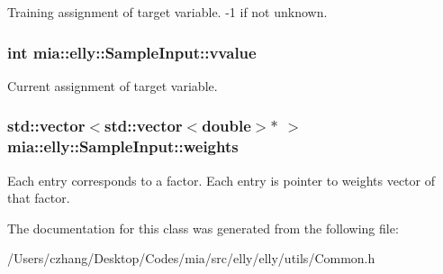 Training assignment of target variable. -\/1 if not unknown. \hypertarget{classmia_1_1elly_1_1_sample_input_a89286408bf1f1ff6fa60b0427f246653}{
\subsubsection[{vvalue}]{\setlength{\rightskip}{0pt plus 5cm}int mia\-::elly\-::\-Sample\-Input\-::vvalue}}\label{classmia_1_1elly_1_1_sample_input_a89286408bf1f1ff6fa60b0427f246653}
Current assignment of target variable. \hypertarget{classmia_1_1elly_1_1_sample_input_a34c24a75257fa27d5d728719afcdde43}{
\subsubsection[{weights}]{\setlength{\rightskip}{0pt plus 5cm}std\-::vector$<$std\-::vector$<$double$>$$\ast$ $>$ mia\-::elly\-::\-Sample\-Input\-::weights}}\label{classmia_1_1elly_1_1_sample_input_a34c24a75257fa27d5d728719afcdde43}
Each entry corresponds to a factor. Each entry is pointer to weights vector of that factor. 

The documentation for this class was generated from the following file\-:\begin{DoxyCompactItemize}
\item 
/\-Users/czhang/\-Desktop/\-Codes/mia/src/elly/elly/utils/Common.\-h\end{DoxyCompactItemize}
